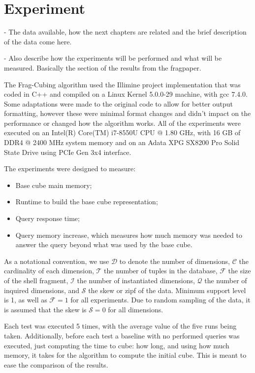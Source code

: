 
\chapter{Experiment}\label{ch:experiment}

- The data available, how the next chapters are related and the brief description of the data come here.

- Also describe how the experiments will be performed and what will be measured. Basically the section of the results from the fragpaper.

The Frag-Cubing algorithm used the Illimine project implementation \cite{illimineSoftwareDataRepository} that was coded in C++ and compiled on a Linux Kernel 5.0.0-29 machine, with gcc 7.4.0.
Some adaptations were made to the original code to allow for better output formatting, however these were minimal format changes and didn't impact on the performance or changed how the algorithm works.
All of the experiments were executed on an Intel(R) Core(TM) i7-8550U CPU @ 1.80 GHz, with 16 GB of DDR4 @ 2400 MHz system memory and on an Adata XPG SX8200 Pro Solid State Drive using PCIe Gen 3x4 interface.

The experiments were designed to measure:

\begin{itemize}
\item Base cube main memory;
\item Runtime to build the base cube representation;
\item Query response time;
\item Query memory increase, which measures how much memory was needed to answer the query beyond what was used by the base cube.
\end{itemize}

As a notational convention, we use \(\mathcal{D}\) to denote the number of dimensions, \(\mathcal{C}\) the cardinality of each dimension, \(\mathcal{T}\) the number of tuples in the database, \(\mathcal{F}\) the size of the shell fragment, \(\mathcal{I}\) the number of instantiated dimensions, \(\mathcal{Q}\) the number of inquired dimensions, and \(\mathcal{S}\) the skew or zipf of the data.
Minimum support level is 1, as well as \(\mathcal{F} = 1\) for all experiments.
Due to random sampling of the data, it is assumed that the skew is \(\mathcal{S} = 0\) for all dimensions.

Each test was executed 5 times, with the average value of the five runs being taken.
Additionally, before each test a baseline with no performed queries was executed, just computing the time to cube: how long, and using how much memory, it takes for the algorithm to compute the initial cube.
This is meant to ease the comparison of the results.

